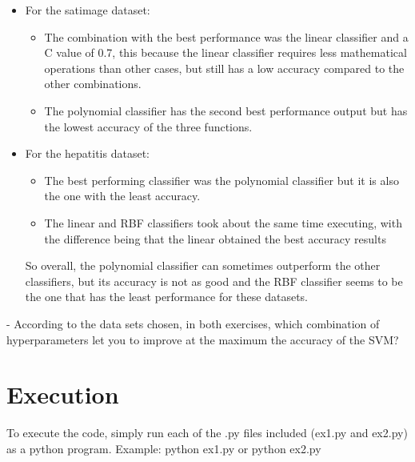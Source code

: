\documentclass[12pt,a4paper]{article}
\begin{document}
\begin{itemize}
\item For the satimage dataset:
	\begin{itemize}
		\item The combination with the best performance was the linear classifier and a C value of 0.7, this because the linear classifier requires less mathematical operations than other cases, but still has a low accuracy compared to the other combinations. 
		\item The polynomial classifier has the second best performance output but has the lowest accuracy of the three functions.
	\end{itemize}
\item For the hepatitis dataset:
	\begin{itemize}
		\item The best performing classifier was the polynomial classifier but it is also the one with the least accuracy.
		\item The linear and RBF classifiers took about the same time executing, with the difference being that the linear obtained the best accuracy results
		
	\end{itemize} 
So overall, the polynomial classifier can sometimes outperform the other classifiers, but its accuracy is not as good and the RBF classifier seems to be the one that has the least performance for these datasets.
\end{itemize}

- According to the data sets chosen, in both exercises, which combination of hyperparameters let you to improve at the maximum the accuracy of the SVM?

\section*{Execution}

To execute the code, simply run each of the .py files included (ex1.py and ex2.py) as a 
python program. Example: python ex1.py or python ex2.py
\end{document}
